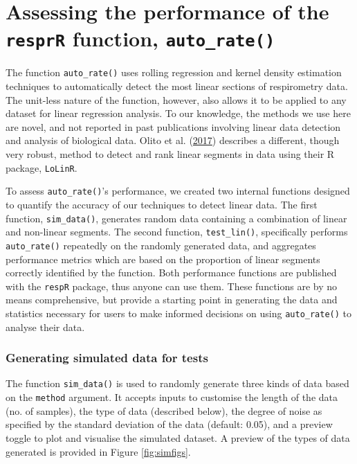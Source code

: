 \documentclass[a4paper,10pt, oneside]{memoir}
\begin{document}
\hypertarget{assessing-the-performance-of-the-resprr-function-auto_rate}{%
\chapter{\texorpdfstring{Assessing the performance of the \texttt{resprR} function, \texttt{auto\_rate()}}{Assessing the performance of the resprR function, auto\_rate()}}\label{assessing-the-performance-of-the-resprr-function-auto_rate}}

The function \texttt{auto\_rate()} uses rolling regression and kernel density estimation techniques to automatically detect the most linear sections of respirometry data.
The unit-less nature of the function, however, also allows it to be applied to any dataset for linear regression analysis.
To our knowledge, the methods we use here are novel, and not reported in past publications involving linear data detection and analysis of biological data.
Olito et al. (\protect\hyperlink{ref-Olito2017}{2017}) describes a different, though very robust, method to detect and rank linear segments in data using their R package, \texttt{LoLinR}.

To assess \texttt{auto\_rate()}'s performance, we created two internal functions designed to quantify the accuracy of our techniques to detect linear data.
The first function, \texttt{sim\_data()}, generates random data containing a combination of linear and non-linear segments.
The second function, \texttt{test\_lin()}, specifically performs \texttt{auto\_rate()} repeatedly on the randomly generated data, and aggregates performance metrics which are based on the proportion of linear segments correctly identified by the function.
Both performance functions are published with the \texttt{respR} package, thus anyone can use them. These functions are by no means comprehensive, but provide a starting point in generating the data and statistics necessary for users to make informed decisions on using \texttt{auto\_rate()} to analyse their data.

\hypertarget{generating-simulated-data-for-tests}{%
\subsection{Generating simulated data for tests}\label{generating-simulated-data-for-tests}}

The function \texttt{sim\_data()} is used to randomly generate three kinds of data based on the \texttt{method} argument.
It accepts inputs to customise the length of the data (no. of samples), the type of data (described below), the degree of noise as specified by the standard deviation of the data (default: 0.05), and a preview toggle to plot and visualise the simulated dataset.
A preview of the types of data generated is provided in Figure \ref{fig:simfigs}.
\end{document}

